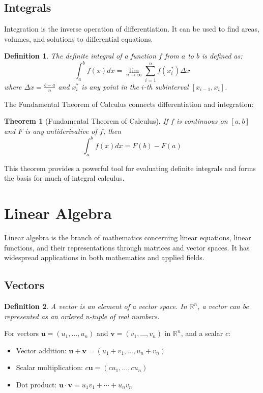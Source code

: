 \documentclass[12pt,a4paper]{article}
\newtheorem{definition}{Definition}
\newtheorem{theorem}{Theorem}
\begin{document}
\subsection{Integrals}

Integration is the inverse operation of differentiation. It can be used to find areas, volumes, and solutions to differential equations.

\begin{definition}
The definite integral of a function $f$ from $a$ to $b$ is defined as:
\[ \int_a^b f(x) dx = \lim_{n \to \infty} \sum_{i=1}^n f(x_i^*) \Delta x \]
where $\Delta x = \frac{b-a}{n}$ and $x_i^*$ is any point in the $i$-th subinterval $[x_{i-1}, x_i]$.
\end{definition}

The Fundamental Theorem of Calculus connects differentiation and integration:

\begin{theorem}[Fundamental Theorem of Calculus]
If $f$ is continuous on $[a,b]$ and $F$ is any antiderivative of $f$, then
\[ \int_a^b f(x) dx = F(b) - F(a) \]
\end{theorem}

This theorem provides a powerful tool for evaluating definite integrals and forms the basis for much of integral calculus.

\section{Linear Algebra}

Linear algebra is the branch of mathematics concerning linear equations, linear functions, and their representations through matrices and vector spaces. It has widespread applications in both mathematics and applied fields.

\subsection{Vectors}

\begin{definition}
A vector is an element of a vector space. In $\mathbb{R}^n$, a vector can be represented as an ordered n-tuple of real numbers.
\end{definition}

For vectors $\mathbf{u} = (u_1, \ldots, u_n)$ and $\mathbf{v} = (v_1, \ldots, v_n)$ in $\mathbb{R}^n$, and a scalar $c$:

\begin{itemize}
    \item Vector addition: $\mathbf{u} + \mathbf{v} = (u_1 + v_1, \ldots, u_n + v_n)$
    \item Scalar multiplication: $c\mathbf{u} = (cu_1, \ldots, cu_n)$
    \item Dot product: $\mathbf{u} \cdot \mathbf{v} = u_1v_1 + \cdots + u_nv_n$
\end{itemize}
\end{document}
